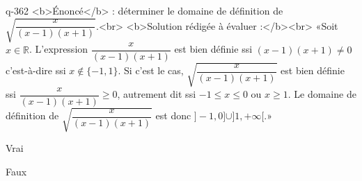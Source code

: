 \begin{truefalse}{q-362}
<b>Énoncé</b> : déterminer le domaine de définition de $\sqrt{\dfrac{x}{(x-1)(x+1)}}$.<br> <b>Solution rédigée à évaluer :</b><br>  «Soit $x\in\mathbb{R}$.  L'expression $\dfrac{x}{(x-1)(x+1)}$ est bien définie ssi $(x-1)(x+1)\neq 0$ c'est-à-dire ssi $x\not\in\{-1,1\}$. Si c'est le cas, $\sqrt{\dfrac{x}{(x-1)(x+1)}}$ est bien définie ssi $\dfrac{x}{(x-1)(x+1)}\geq 0$, autrement dit ssi $-1\leq x\leq 0$ ou $x\geq 1$. Le domaine de définition de $\sqrt{\dfrac{x}{(x-1)(x+1)}}$ est donc $]-1,0]\cup ]1,+\infty[$.»
\item* Vrai
\item Faux
\end{truefalse}

